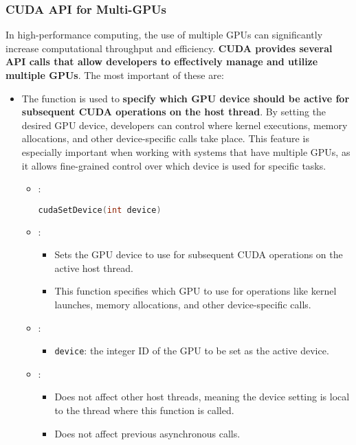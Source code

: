 \subsubsection{CUDA API for Multi-GPUs}

In high-performance computing, the use of multiple GPUs can significantly increase computational throughput and efficiency. \textbf{CUDA provides several API calls that allow developers to effectively manage and utilize multiple GPUs}. The most important of these are:
\begin{itemize}
    \item The  function is used to \textbf{specify which GPU device should be active for subsequent CUDA operations on the host thread}. By setting the desired GPU device, developers can control where kernel executions, memory allocations, and other device-specific calls take place. This feature is especially important when working with systems that have multiple GPUs, as it allows fine-grained control over which device is used for specific tasks.
    \begin{itemize}
        \item {}:
        \begin{lstlisting}[language=C++]
cudaSetDevice(int device)\end{lstlisting}
        \item {}:
        \begin{itemize}
            \item Sets the GPU device to use for subsequent CUDA operations on the active host thread.
            \item This function specifies which GPU to use for operations like kernel launches, memory allocations, and other device-specific calls.
        \end{itemize}
        \item {}:
        \begin{itemize}
            \item \texttt{device}: the integer ID of the GPU to be set as the active device.
        \end{itemize}
        \item {}:
        \begin{itemize}
            \item Does not affect other host threads, meaning the device setting is local to the thread where this function is called.
            \item Does not affect previous asynchronous calls.

\end{itemize}
\end{itemize}
\end{itemize}
